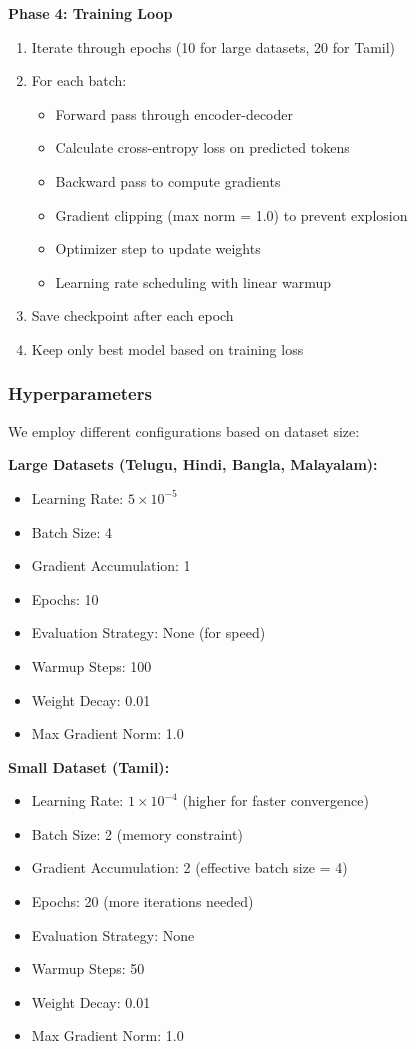 \documentclass[12pt,a4paper]{article}
\begin{document}
\textbf{Phase 4: Training Loop}
\begin{enumerate}
    \item Iterate through epochs (10 for large datasets, 20 for Tamil)
    \item For each batch:
    \begin{itemize}
        \item Forward pass through encoder-decoder
        \item Calculate cross-entropy loss on predicted tokens
        \item Backward pass to compute gradients
        \item Gradient clipping (max norm = 1.0) to prevent explosion
        \item Optimizer step to update weights
        \item Learning rate scheduling with linear warmup
    \end{itemize}
    \item Save checkpoint after each epoch
    \item Keep only best model based on training loss
\end{enumerate}

\subsubsection{Hyperparameters}
We employ different configurations based on dataset size:

\textbf{Large Datasets (Telugu, Hindi, Bangla, Malayalam):}
\begin{itemize}
    \item Learning Rate: $5 \times 10^{-5}$
    \item Batch Size: 4
    \item Gradient Accumulation: 1
    \item Epochs: 10
    \item Evaluation Strategy: None (for speed)
    \item Warmup Steps: 100
    \item Weight Decay: 0.01
    \item Max Gradient Norm: 1.0
\end{itemize}

\textbf{Small Dataset (Tamil):}
\begin{itemize}
    \item Learning Rate: $1 \times 10^{-4}$ (higher for faster convergence)
    \item Batch Size: 2 (memory constraint)
    \item Gradient Accumulation: 2 (effective batch size = 4)
    \item Epochs: 20 (more iterations needed)
    \item Evaluation Strategy: None
    \item Warmup Steps: 50
    \item Weight Decay: 0.01
    \item Max Gradient Norm: 1.0
\end{itemize}
\end{document}
